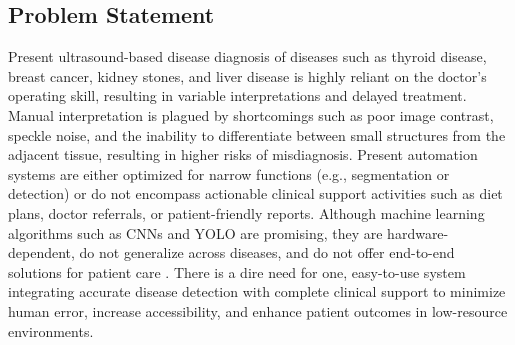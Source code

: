 \documentclass[12pt]{article}
\begin{document}
\subsection{Problem Statement}
\vspace{10pt}
Present ultrasound-based disease diagnosis of diseases such as thyroid disease, breast cancer, kidney stones, and liver disease is highly reliant on the doctor’s operating skill, resulting in variable
interpretations and delayed treatment. Manual interpretation is plagued by shortcomings such
as poor image contrast, speckle noise, and the inability to differentiate between small structures
from the adjacent tissue, resulting in higher risks of misdiagnosis. Present automation systems
are either optimized for narrow functions (e.g., segmentation or detection) or do not encompass
actionable clinical support activities such as diet plans, doctor referrals, or patient-friendly reports. Although machine learning algorithms such as CNNs and YOLO are promising, they are
hardware-dependent, do not generalize across diseases, and do not offer end-to-end solutions for
patient care . There is a dire need for one, easy-to-use system integrating accurate disease detection with complete clinical support to minimize human error, increase accessibility, and enhance
patient outcomes in low-resource environments.
\end{document}
